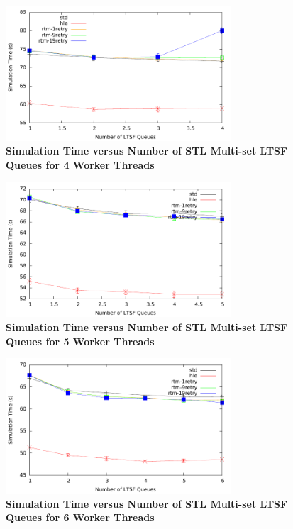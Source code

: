 \documentclass[11pt]{book}
\begin{document}
\begin{figure}[H]
    \centering
    \graphicspath{ {./figures/} }
    \includegraphics[width=0.75\textwidth,keepaspectratio]{contThrMig-hugeEpidemicSim-timeVSschedQs-multiset-4thread}
    \caption{\textbf{Simulation Time versus Number of STL Multi-set LTSF Queues
    for 4 Worker Threads}}
    \label{fig:contThrMig_timeVSschq_4threads}
\end{figure}

\begin{figure}[H]
    \centering
    \graphicspath{ {./figures/} }
    \includegraphics[width=0.75\textwidth,keepaspectratio]{contThrMig-hugeEpidemicSim-timeVSschedQs-multiset-5thread}
    \caption{\textbf{Simulation Time versus Number of STL Multi-set LTSF Queues
    for 5 Worker Threads}}
    \label{fig:contThrMig_timeVSschq_5threads}
\end{figure}

\begin{figure}[H]
    \centering
    \graphicspath{ {./figures/} }
    \includegraphics[width=0.75\textwidth,keepaspectratio]{contThrMig-hugeEpidemicSim-timeVSschedQs-multiset-6thread}
    \caption{\textbf{Simulation Time versus Number of STL Multi-set LTSF Queues
    for 6 Worker Threads}}
    \label{fig:contThrMig_timeVSschq_6threads}
\end{figure}
\end{document}
